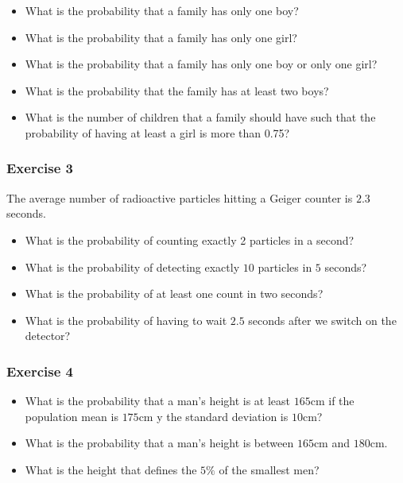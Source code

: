 \documentclass[
]{book}
\providecommand{\tightlist}{%
  \setlength{\itemsep}{0pt}\setlength{\parskip}{0pt}}
\begin{document}
\begin{itemize}
\tightlist
\item
  What is the probability that a family has only one boy?
\item
  What is the probability that a family has only one girl?
\item
  What is the probability that a family has only one boy or only one girl?
\item
  What is the probability that the family has at least two boys?
\item
  What is the number of children that a family should have such that the probability of having at least a girl is more than 0.75?
\end{itemize}

\hypertarget{exercise-3-2}{%
\subsubsection{Exercise 3}\label{exercise-3-2}}

The average number of radioactive particles hitting a Geiger counter is \(2.3\) seconds.

\begin{itemize}
\item
  What is the probability of counting exactly 2 particles in a second?
\item
  What is the probability of detecting exactly \(10\) particles in \(5\) seconds?
\item
  What is the probability of at least one count in two seconds?
\item
  What is the probability of having to wait \(2.5\) seconds after we switch on the detector?
\end{itemize}

\hypertarget{exercise-4-2}{%
\subsubsection{Exercise 4}\label{exercise-4-2}}

\begin{itemize}
\item
  What is the probability that a man's height is at least
  \(165\)cm if the population mean is \(175\)cm y the standard deviation is \(10\)cm?
\item
  What is the probability that a man's height is between
  \(165\)cm and \(180\)cm.
\item
  What is the height that defines the \(5\%\) of the smallest men?
\end{itemize}
\end{document}
